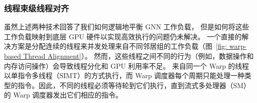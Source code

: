 \subsubsection{线程束级线程对齐}
虽然上述两种技术回答了我们如何逻辑地平衡 GNN 工作负载，
但是如何将这些工作负载映射到底层 GPU 硬件以实现高效执行的问题仍未解决。
一个直接的解决方案是分配连续的线程来并发处理来自不同邻居组的工作负载（图~\ref{fig: warp-based Thread Alignment}）。
然而，这些线程之间不同的行为（例如，数据操作和内存访问操作）会导致线程分化和 GPU 利用率不足。
来自同一个 Warp 的线程以单指令多线程（SIMT）的方式执行，而 Warp 调度器每个周期只能处理一种类型的指令。因此，不同的线程必须等待轮到它们执行，直到流式多处理器（SM）的 Warp 调度器发出它们相应的指令。

